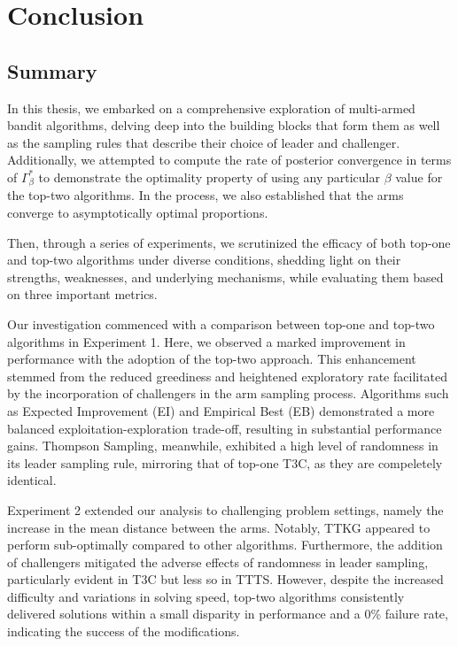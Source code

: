 \documentclass[a4paper, 12pt]{article}
\theoremstyle{definition}
\begin{document}
\section{Conclusion}
\subsection{Summary}
In this thesis, we embarked on a comprehensive exploration of multi-armed bandit algorithms, delving deep into the building blocks that form them as well as the sampling rules that describe their choice of leader and challenger. Additionally, we attempted to compute the rate of posterior convergence in terms of $\Gamma_\beta^*$ to demonstrate the optimality property of using any particular $\beta$ value for the top-two algorithms. In the process, we also established that the arms converge to asymptotically optimal proportions.

Then, through a series of experiments, we scrutinized the efficacy of both top-one and top-two algorithms under diverse conditions, shedding light on their strengths, weaknesses, and underlying mechanisms, while evaluating them based on three important metrics.

Our investigation commenced with a comparison between top-one and top-two algorithms in Experiment 1. Here, we observed a marked improvement in performance with the adoption of the top-two approach. This enhancement stemmed from the reduced greediness and heightened exploratory rate facilitated by the incorporation of challengers in the arm sampling process. Algorithms such as Expected Improvement (EI) and Empirical Best (EB) demonstrated a more balanced exploitation-exploration trade-off, resulting in substantial performance gains. Thompson Sampling, meanwhile, exhibited a high level of randomness in its leader sampling rule, mirroring that of top-one T3C, as they are compeletely identical.

Experiment 2 extended our analysis to challenging problem settings, namely the increase in the mean distance between the arms. Notably, TTKG appeared to perform sub-optimally compared to other algorithms. Furthermore, the addition of challengers mitigated the adverse effects of randomness in leader sampling, particularly evident in T3C but less so in TTTS. However, despite the increased difficulty and variations in solving speed, top-two algorithms consistently delivered solutions within a small disparity in performance and a 0\% failure rate, indicating the success of the modifications.
\end{document}
